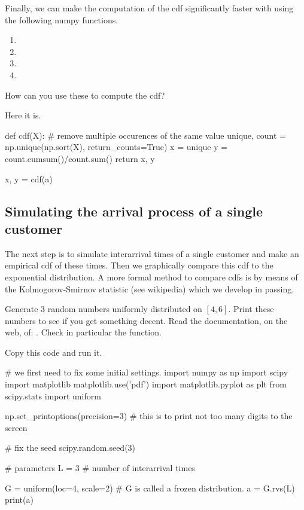 \documentclass{scrartcl}
\begin{document}
\begin{exercise}
Finally, we can make the computation of the cdf significantly faster with using the following numpy functions. 
\begin{enumerate}
\item {}
\item {}
\item {}
\item {}
\end{enumerate}
How can you use these to compute the cdf?
\begin{solution}
Here it is.
\begin{pyblock}

def cdf(X):
    # remove multiple occurences of the same value
    unique, count = np.unique(np.sort(X), return_counts=True)
    x = unique
    y = count.cumsum()/count.sum()
    return x, y

x, y = cdf(a)
\end{pyblock}

\end{solution}
\end{exercise}

\subsection{Simulating the arrival process of a single customer}
\label{sec:simulations}

The next step is to simulate interarrival times of a single customer and  make an empirical cdf of these times.  Then we graphically compare this cdf to the exponential distribution. A more formal method to compare cdfs is by means of the Kolmogorov-Smirnov statistic (see wikipedia) which we develop in passing.

\begin{exercise}
  Generate 3 random numbers uniformly distributed on $[4,6]$.  Print these numbers to see if you get something decent. Read the documentation, on the web, of:
 .  Check in particular the  function. 

\begin{solution}
Copy this code and run it.
\begin{pyverbatim}
# we first need to fix some initial settings.
import numpy as np
import scipy
import matplotlib
matplotlib.use('pdf') 
import matplotlib.pyplot as plt
from scipy.stats import uniform

np.set_printoptions(precision=3) # this is to print not too many digits to the screen

# fix the seed
scipy.random.seed(3) 

# parameters
L = 3  # number of interarrival times

G = uniform(loc=4, scale=2) # G is called a frozen distribution.
a = G.rvs(L)
print(a)
\end{pyverbatim}
  
\end{solution}

\end{exercise}
\end{document}
